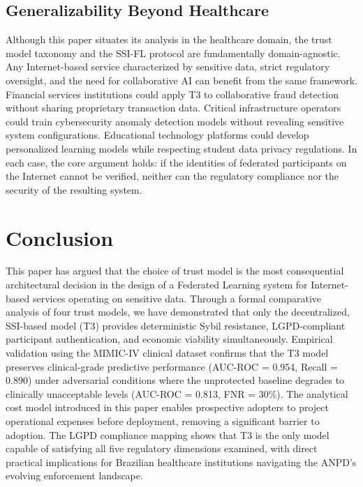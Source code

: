 \documentclass{sbc2023}
\begin{document}
\subsection{Generalizability Beyond Healthcare}

Although this paper situates its analysis in the healthcare domain, the trust model taxonomy and the SSI-FL protocol are fundamentally domain-agnostic. Any Internet-based service characterized by sensitive data, strict regulatory oversight, and the need for collaborative AI can benefit from the same framework. Financial services institutions could apply T3 to collaborative fraud detection without sharing proprietary transaction data. Critical infrastructure operators could train cybersecurity anomaly detection models without revealing sensitive system configurations. Educational technology platforms could develop personalized learning models while respecting student data privacy regulations. In each case, the core argument holds: if the identities of federated participants on the Internet cannot be verified, neither can the regulatory compliance nor the security of the resulting system.


\section{Conclusion}
\label{sec:conclusion}

This paper has argued that the choice of trust model is the most consequential architectural decision in the design of a Federated Learning system for Internet-based services operating on sensitive data. Through a formal comparative analysis of four trust models, we have demonstrated that only the decentralized, SSI-based model (T3) provides deterministic Sybil resistance, LGPD-compliant participant authentication, and economic viability simultaneously. Empirical validation using the MIMIC-IV clinical dataset confirms that the T3 model preserves clinical-grade predictive performance (AUC-ROC = 0.954, Recall = 0.890) under adversarial conditions where the unprotected baseline degrades to clinically unacceptable levels (AUC-ROC = 0.813, FNR = 30\%). The analytical cost model introduced in this paper enables prospective adopters to project operational expenses before deployment, removing a significant barrier to adoption. The LGPD compliance mapping shows that T3 is the only model capable of satisfying all five regulatory dimensions examined, with direct practical implications for Brazilian healthcare institutions navigating the ANPD's evolving enforcement landscape.
\end{document}
